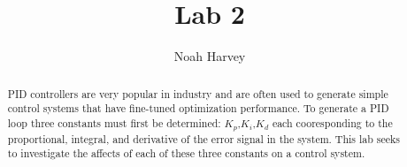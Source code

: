 \documentclass[a4paper,titlepage]{article}
\begin{document}
\title{Lab 2}
\author{Noah Harvey}
\maketitle

\begin{abstract}
	PID controllers are very popular in industry and are often used to generate
	simple control systems that have fine-tuned optimization performance. To
	generate a PID loop three constants must first be determined:
	$K_p$,$K_i$,$K_d$ each cooresponding to the proportional, integral, and
	derivative of the error signal in the system. This lab seeks to investigate
	the affects of each of these three constants on a control system.
\end{abstract}

\tableofcontents
\listoftables
\listoffigures

\pagebreak




%
\end{document}
